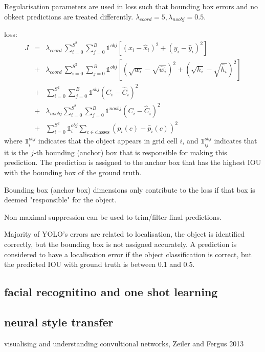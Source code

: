 \documentclass{article}
\begin{document}
Regularisation parameters are used in loss such that bounding box errors and no obkect predictions are treated differently. $\lambda_{coord} = 5, \lambda_{noobj} = 0.5$.

loss:
\begin{eqnarray*}
J & = & \lambda_{coord}\,\sum_{i=0}^{S^2} \sum_{j=0}^{B} \mathds{1}^{obj} \left[(x_i - \hat{x}_i)^2 + (y_i - \hat{y}_i)^2 \right] \\
 & + & \lambda_{coord}\,\sum_{i=0}^{S^2} \sum_{j=0}^{B} \mathds{1}^{obj} \left[(\sqrt{w_i} - \sqrt{\hat{w}_i})^2  + (\sqrt{h_i} - \sqrt{\hat{h}_i})^2  \right] \\
  & + & \sum_{i=0}^{S^2} \sum_{j=0}^{B} \mathds{1}^{obj} \left( C_i - \hat{C}_i  \right)^2 \\
  & + & \lambda_{noobj} \sum_{i=0}^{S^2} \sum_{j=0}^{B} \mathds{1}^{noobj} \left( C_i - \hat{C}_i  \right)^2 \\
  & + &  \sum_{i=0}^{S^2}  \mathds{1}^{obj}_i  \sum_{c \in \mathrm{classes} }\left( p_i(c) - \hat{p}_i(c)  \right)^2
\end{eqnarray*}
where $\mathds{1}^{obj}_i$ indicates that the object appears in grid cell $i$, and $\mathds{1}^{obj}_{ij}$ indicates that it is the $j$-th bounding (anchor) box that is responsible for making this prediction. The prediction is assigned to the anchor box that has the highest IOU with the bounding box of the ground truth.

Bounding box (anchor box) dimensions only contribute to the loss if that box is deemed "responsible" for the object. 

Non maximal suppression can be used to trim/filter final predictions.

Majority of YOLO's errors are related to localisation, the object is identified correctly, but the bounding box is not assigned accurately. A prediction is considered to have a localisation error if the object classification is correct, but the predicted IOU with ground truth is between 0.1 and 0.5.



\subsection{facial recognitino and one shot learning}


\subsection{neural style transfer}
visualising and understanding convultional networks, Zeiler and Fergus 2013
\end{document}
